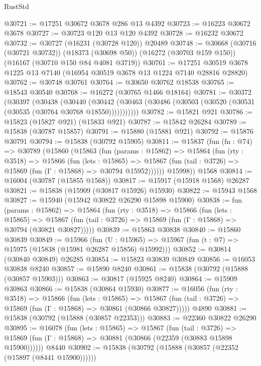 \begin{lexlean}{RustStd}
\begin{coremodule}
@30721 := @17251 @30672 @3678 @286 @13 @4392
@30723 := @16223 @30672 @3678
@30727 := @30723 @120 @13 @120 @4392
@30728 := @16232 @30672
@30732 := @30727 (@16231 (@30728 @120)) @20489
@30748 := @30668
    (@30716 (@30721 @30732))
    (@18373 (@30698 @50))
    (@16272 (@30703 @159 @150))
    (@16167 (@30710 @150 @84 @4081 @3719))
@30761 := @17251 @30519 @3678 @1225 @13 @7140 (@16954 @30519 @3678 @13 @1224 @7140 @28816 @28820)
@30762 := @30748 @30761
@30764 := @30650 @30762 @18538
@30765 := @18543 @30540
@30768 := @16272 (@30765 @1466 @18164)
@30781 := @30372
    (@30397
      (@30438
        (@30440
          (@30442 (@30463 (@30486 (@30503 (@30520 (@30531 (@30535 (@30764 @30768 @18550)))))))))))
@30782 := @15821 @921
@30786 := @15823 (@15827 @921) (@15833 @921)
@30787 := @15842 @26284
@30789 := @15838 (@30787 @15857)
@30791 := @15880 (@15881 @921)
@30792 := @15876 @30791
@30794 := @15838 (@30792 @15905)
@30811 := @15837
    (fun (fn : @74) =>
    @30789
      (@15860
        (@15863
          (fun (params : @15862) =>
          @15864
            (fun (rty : @3518) =>
            @15866
              (fun (lets : @15865) =>
              @15867 (fun (tail : @3726) => @15869 (fun (Γ : @15868) => @30794 @15952))))))
        @15998))
    @1568
@30814 := @16004 (@30787 (@15855 @1568))
@30817 := @15917 (@15918 @1568) @26287
@30821 := @15838 (@15909 (@30817 @15926) @15930)
@30822 := @15943 @1568
@30827 := @15940 (@15942 @30822 @26290 @15898 @15900)
@30838 := fun (params : @15862) =>
  @15864
    (fun (rty : @3518) =>
    @15866
      (fun (lets : @15865) =>
      @15867 (fun (tail : @3726) => @15869 (fun (Γ : @15868) => @30794 (@30821 @30827)))))
@30839 := @15863 @30838
@30840 := @15860 @30839
@30849 := @15966
    (fun (U : @15965) => @15967 (fun (t : @7) => @15975 (@15838 (@15981 @26287 @15856) @15992)))
@30852 := @30814 (@30840 @30849) @26285
@30854 := @15823 @30839 @30849
@30856 := @16053 @30838 @8240
@30857 := @15890 @8240
@30861 := @15838 (@30792 (@15888 (@30857 @15903)))
@30863 := @30817 (@15925 @8240)
@30864 := @15909 @30863
@30866 := @15838 (@30864 @15930)
@30877 := @16056
    (fun (rty : @3518) =>
    @15866
      (fun (lets : @15865) =>
      @15867 (fun (tail : @3726) => @15869 (fun (Γ : @15868) => @30861 (@30866 @30827)))))
    @4890
@30881 := @15838 (@30792 (@15888 (@30857 @22353)))
@30883 := @22360 @30822 @26290
@30895 := @16078
    (fun (lets : @15865) =>
    @15867
      (fun (tail : @3726) =>
      @15869 (fun (Γ : @15868) => @30881 (@30866 (@22359 (@30883 @15898 @15900))))))
    @8440
@30902 := @15838 (@30792 (@15888 (@30857 (@22352 (@15897 (@8441 @15900))))))

\end{coremodule}
\end{lexlean}
